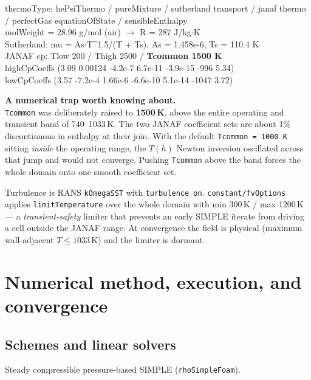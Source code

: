 \documentclass[11pt]{article}
\newcommand{\file}[1]{\texttt{\small #1}}
\newcommand{\warnbox}[2]{%
  \begin{center}\colorbox{warnbg}{\begin{minipage}{0.94\linewidth}\vspace{3pt}
  \textbf{#1}\\[2pt]#2\vspace{3pt}\end{minipage}}\end{center}}
\begin{document}
\begin{center}\small
\begin{minipage}{0.92\linewidth}\ttfamily\footnotesize
thermoType: hePsiThermo / pureMixture / sutherland transport / janaf thermo\\
\phantom{thermoType: }/ perfectGas equationOfState / sensibleEnthalpy\\
molWeight = 28.96 g/mol (air) $\rightarrow$ R = 287 J/kg$\cdot$K\\
Sutherland: mu = As$\cdot$T\^{}1.5/(T + Ts), As = 1.458e-6, Ts = 110.4 K\\
JANAF cp: Tlow 200 / Thigh 2500 / \textbf{Tcommon 1500 K}\\
\phantom{JANAF cp: }highCpCoeffs (3.09 0.00124 -4.2e-7 6.7e-11 -3.9e-15 -996 5.34)\\
\phantom{JANAF cp: }lowCpCoeffs (3.57 -7.2e-4 1.66e-6 -6.6e-10 5.1e-14 -1047 3.72)
\end{minipage}
\end{center}

\warnbox{A numerical trap worth knowing about.}{\file{Tcommon} was deliberately raised to \textbf{1500\,K},
above the entire operating and transient band of 740--1033\,K. The two JANAF coefficient sets are about 1\%
discontinuous in enthalpy at their join. With the default \file{Tcommon = 1000 K} sitting \emph{inside} the
operating range, the $T(h)$ Newton inversion oscillated across that jump and would not converge. Pushing
\file{Tcommon} above the band forces the whole domain onto one smooth coefficient set.}

Turbulence is RANS \file{kOmegaSST} with \file{turbulence on}. \file{constant/fvOptions} applies
\file{limitTemperature} over the whole domain with min 300\,K / max 1200\,K --- a \emph{transient-safety}
limiter that prevents an early SIMPLE iterate from driving a cell outside the JANAF range. At convergence the
field is physical (maximum wall-adjacent $T \leq 1033$\,K) and the limiter is dormant.


\section{Numerical method, execution, and convergence}

\subsection{Schemes and linear solvers}

Steady compressible pressure-based SIMPLE (\file{rhoSimpleFoam}).
\end{document}

